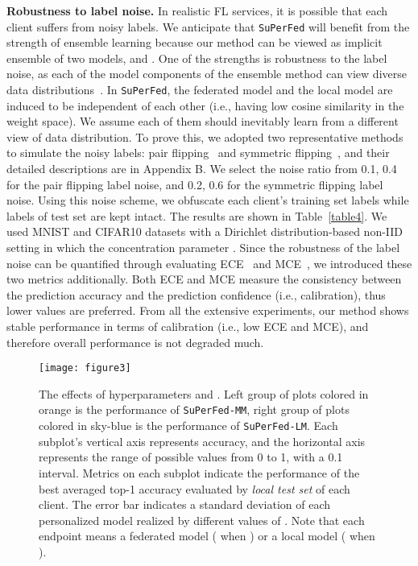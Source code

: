 \documentclass[sigconf]{acmart}
\begin{document}
\medskip 
\noindent\textbf{Robustness to label noise.} In realistic FL services, it is possible that each client suffers from noisy labels. We anticipate that \texttt{SuPerFed} will benefit from the strength of ensemble learning because our method can be viewed as implicit ensemble of two models,  and . One of the strengths is robustness to the label noise, as each of the model components of the ensemble method can view diverse data distributions~\cite{ensemblenoise,ensemblenoise2}. In \texttt{SuPerFed}, the federated model and the local model are induced to be independent of each other (i.e., having low cosine similarity in the weight space). We assume each of them should inevitably learn from a different view of data distribution. To prove this, we adopted two representative methods to simulate the noisy labels: pair flipping~\cite{pair} and symmetric flipping~\cite{symm}, and their detailed descriptions are in Appendix B. We select the noise ratio from {0.1, 0.4} for the pair flipping label noise, and {0.2, 0.6} for the symmetric flipping label noise. Using this noise scheme, we obfuscate each client's training set labels while labels of test set are kept intact. The results are shown in Table~\ref{table4}.
We used MNIST and CIFAR10 datasets with a Dirichlet distribution-based non-IID setting in which the concentration parameter . Since the robustness of the label noise can be quantified through evaluating ECE~\cite{ece} and MCE~\cite{mce}, we introduced these two metrics additionally. Both ECE and MCE measure the consistency between the prediction accuracy and the prediction confidence (i.e., calibration), thus lower values are preferred. From all the extensive experiments, our method shows stable performance in terms of calibration (i.e., low ECE and MCE), and therefore overall performance is not degraded much.
\vspace{-1.5mm}

\begin{figure*}[h]
\centering
\texttt{[image: figure3]}
\caption{The effects of hyperparameters  and . Left group of plots colored in orange is the performance of \texttt{SuPerFed-MM}, right group of plots colored in sky-blue is the performance of \texttt{SuPerFed-LM}. Each subplot's vertical axis represents accuracy, and the horizontal axis represents the range of possible  values from 0 to 1, with a 0.1 interval. Metrics on each subplot indicate the performance of the best averaged top-1 accuracy evaluated by \textit{local test set} of each client. The error bar indicates a standard deviation of each personalized model realized by different values of . Note that each endpoint means a federated model ( when ) or a local model ( when ).}
\label{fig3}
\end{figure*}
\end{document}
